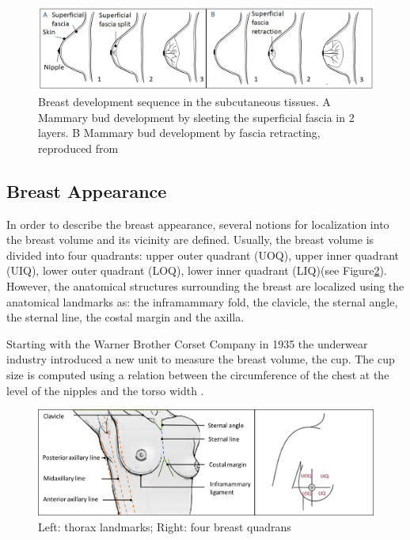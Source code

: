 \begin{figure}[!h]
\centering
\includegraphics[width=0.9\linewidth,keepaspectratio]{figures/breastEvol_fascia_my.jpg} 
\caption[Breast development sequence into subcutaneous tissues. A Mammary bud development by splitting the superficial fascia in 2 layers. B Mammary bud development by superficial fascia retracting]{Breast development sequence in the subcutaneous tissues. A Mammary bud development by sleeting the superficial fascia in 2 layers. B Mammary bud development by fascia retracting, reproduced from  \citep{kopans2007breast}  }
\label{breastevol_fascia}
\end{figure}


\subsection{Breast Appearance}\label{subsection:breastappearance}

In order to describe the breast appearance, several notions for localization into the breast volume and its vicinity are defined. Usually, the breast volume is divided into four quadrants: upper outer quadrant (UOQ), upper inner quadrant (UIQ), lower outer quadrant (LOQ), lower inner quadrant (LIQ)(see Figure\ref{fig:Breast_quadrants_full}). However, the anatomical structures surrounding the breast are localized using the anatomical landmarks as:  the inframammary fold, the clavicle, the sternal angle, the sternal line, the costal margin and the axilla.

Starting with the Warner Brother Corset Company in 1935 the underwear industry introduced a new unit to measure the breast volume, the cup. The cup size is computed using a relation between the circumference of the chest at the level of the nipples and the torso width \citep{pechter_new_1998}.

\begin{figure}[h]
\centering
 \includegraphics[width=\textwidth,keepaspectratio]{figures/Breast_quadrants_full.png}
  \caption{Left: thorax landmarks; Right: four breast quadrans \citep{vandeput2002considerations}}\label{fig:Breast_quadrants_full}
\end{figure}


